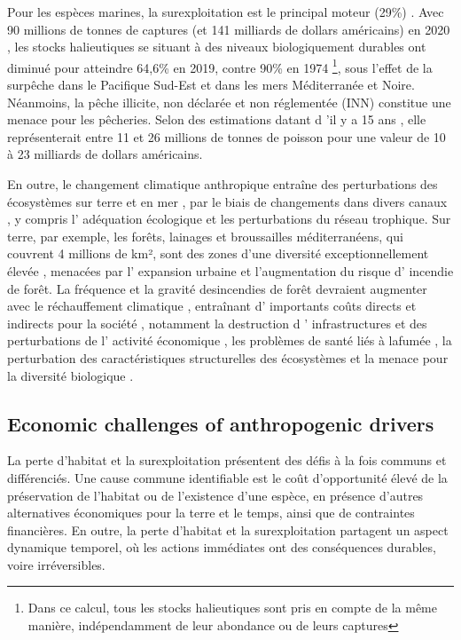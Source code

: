 \begin{displayquote}
\begin{displayquote}
\begin{displayquote}
Pour les espèces marines, la surexploitation est le principal moteur (29\%) \citep{ipbes_2022_6417333}. Avec 90 millions de tonnes de captures (et 141 milliards de dollars américains) en 2020 \citep{fao_2022_state}, les stocks halieutiques se situant à des niveaux biologiquement durables ont diminué pour atteindre 64,6\% en 2019, contre 90\% en 1974 \footnote{ Dans ce calcul, tous les stocks halieutiques sont pris en compte de la même manière, indépendamment de leur abondance ou de leurs captures}, sous l'effet de la surpêche dans le Pacifique Sud-Est et dans les mers Méditerranée et Noire. Néanmoins, la pêche illicite, non déclarée et non réglementée (INN) constitue une menace pour les pêcheries.   Selon des estimations datant d 'il y a 15 ans \citep{agnew_estimating_2009} , elle représenterait entre 11 et 26 millions de tonnes de poisson pour une valeur de 10 à 23 milliards de dollars américains. 

En outre, le changement climatique anthropique entraîne des perturbations des écosystèmes sur terre \citep{burrell_anthropogenic_2020, conradi_reassessment_2024} et en mer \citep{gomes_marine_2024}, par le biais de changements dans divers canaux , y compris l' adéquation écologique et les perturbations du réseau trophique. Sur terre, par exemple, les forêts, lainages et broussailles méditerranéens, qui couvrent 4 millions de km², sont des zones d'une diversité exceptionnellement élevée \citep{Mooney2001, blondel_2010}, menacées par l' expansion urbaine et l'augmentation du risque d' incendie de forêt.     La fréquence et la gravité desincendies de forêt devraient augmenter avec le réchauffement climatique \citep{Dupuy2019ClimateCI}, entraînant d' importants coûts directs et indirects pour la société , notamment la destruction d ' infrastructures et des perturbations de l' activité économique \citep{wang_economic_2021}, les problèmes de santé liés à lafumée \citep{burke_wildfire_2023, heft-neal_behavior_2023}, la perturbation des caractéristiques structurelles des écosystèmes \citep{Ayars2023} et la menace pour la diversité biologique \citep{Wintle2020}.

{}
\subsection*{Economic challenges of anthropogenic drivers}


La perte d'habitat et la surexploitation présentent des défis à la fois communs et différenciés.     Une cause commune identifiable est le coût d'opportunité élevé de la préservation de l'habitat ou de l'existence d'une espèce, en présence d'autres alternatives économiques pour la terre et le temps, ainsi que de contraintes financières. En outre, la perte d'habitat et la surexploitation partagent un aspect dynamique temporel, où les actions immédiates ont des conséquences durables, voire irréversibles.


\end{displayquote}
\end{displayquote}
\end{displayquote}

